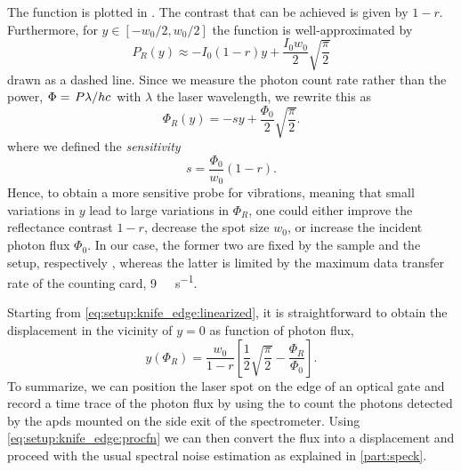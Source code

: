 The function is plotted in .
The contrast that can be achieved is given by $1-r$.
Furthermore, for $y\in[-w_0/2, w_0/2]$ the function is well-approximated by
\begin{equation}\label{eq:setup:knife_edge:approx}
    P_R(y)\approx -I_0(1-r)y + \frac{I_0 w_0}{2}\sqrt{\frac{\pi}{2}}
\end{equation}
drawn as a dashed line.
Since we measure the photon count rate rather than the power, $\Phi = \flatfrac{P\lambda}{hc}$ with $\lambda$ the laser wavelength, we rewrite this as
\begin{equation}\label{eq:setup:knife_edge:linearized}
    \Phi_R(y) = -sy + \frac{\Phi_0}{2}\sqrt{\frac{\pi}{2}}.
\end{equation}
where we defined the \emph{sensitivity}
\begin{equation}\label{eq:setup:knife_edge:sensitivity}
    s = \frac{\Phi_0}{w_0}(1 - r).
\end{equation}
Hence, to obtain a more sensitive probe for vibrations, meaning that small variations in $y$ lead to large variations in $\Phi_R$, one could either improve the reflectance contrast $1-r$, decrease the spot size $w_0$, or increase the incident photon flux $\Phi_0$.
In our case, the former two are fixed by the sample and the setup, respectively , whereas the latter is limited by the maximum data transfer rate of the \tagger counting card, \qty{9}{\mega\sample\per\second}.

Starting from \cref{eq:setup:knife_edge:linearized}, it is straightforward to obtain the displacement in the vicinity of $y=0$ as function of photon flux,
\begin{equation}\label{eq:setup:knife_edge:procfn}
     y(\Phi_R) = \frac{w_0}{1-r}\left[\frac{1}{2}\sqrt{\frac{\pi}{2}} - \frac{\Phi_R}{\Phi_0}\right].
\end{equation}
To summarize, we can position the laser spot on the edge of an optical gate and record a time trace of the photon flux by using the \taggershort to count the photons detected by the \glspl{apd} mounted on the side exit of the spectrometer.
Using \cref{eq:setup:knife_edge:procfn} we can then convert the flux into a displacement and proceed with the usual spectral noise estimation as explained in \cref{part:speck}.

